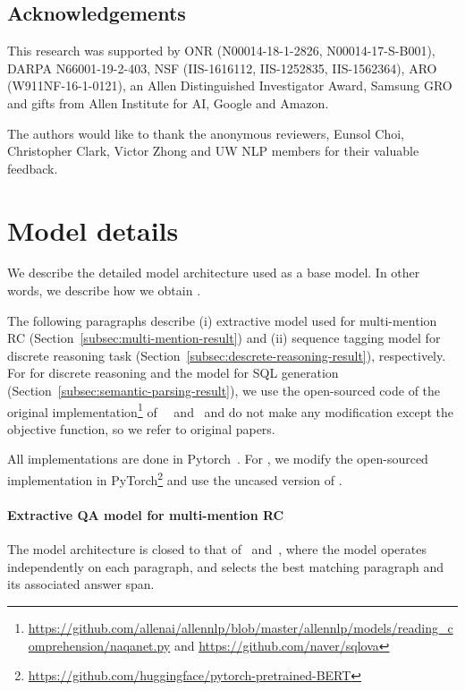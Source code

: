 \documentclass[11pt,a4paper]{article}
\begin{document}
\subsection*{Acknowledgements}
This research was supported by ONR (N00014-18-1-2826, N00014-17-S-B001), DARPA N66001-19-2-403, NSF (IIS-1616112, IIS-1252835, IIS-1562364), ARO (W911NF-16-1-0121), an Allen Distinguished Investigator Award, Samsung GRO and gifts from Allen Institute for AI, Google and Amazon. 

The authors would like to thank the anonymous reviewers, Eunsol Choi, Christopher Clark, Victor Zhong and UW NLP members for their valuable feedback.




\clearpage
\appendix
\section{Model details}\label{app:model-details}We describe the detailed model architecture used as a base model. In other words, we describe how we obtain .

The following paragraphs describe (i) \bert{} extractive model used for multi-mention RC (Section~\ref{subsec:multi-mention-result}) and (ii) \bert{} sequence tagging model for discrete reasoning task (Section~\ref{subsec:descrete-reasoning-result}), respectively. For \qanet{} for discrete reasoning and the model for SQL generation (Section~\ref{subsec:semantic-parsing-result}), we use the open-sourced code of the original implementation\footnote{\url{https://github.com/allenai/allennlp/blob/master/allennlp/models/reading_comprehension/naqanet.py} and \url{https://github.com/naver/sqlova}} of~~\citet{drop} and~\citet{hwang2019comprehensive} and do not make any modification except the objective function, so we refer to original papers.

All implementations are done in Pytorch~\citep{pytorch}. For \bert{}, we modify the open-sourced implementation in PyTorch\footnote{\url{https://github.com/huggingface/pytorch-pretrained-BERT}} and use the uncased version of \bert{}.

\paragraph{Extractive QA model for multi-mention RC}
The model architecture is closed to that of~\citet{min2019compositional} and~\citet{alberti2019bert}, where the model operates independently on each paragraph, and selects the best matching paragraph and its associated answer span.
\end{document}
